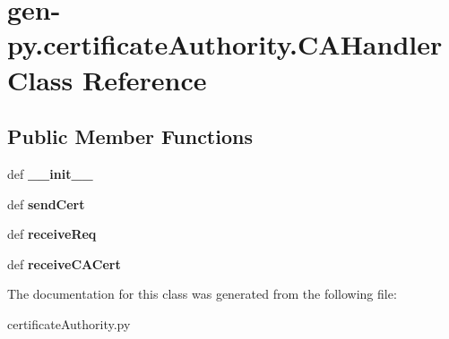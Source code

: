 \hypertarget{classgen-py_1_1certificateAuthority_1_1CAHandler}{\section{gen-\/py.certificate\-Authority.\-C\-A\-Handler \-Class \-Reference}
\label{classgen-py_1_1certificateAuthority_1_1CAHandler}
}
\subsection*{\-Public \-Member \-Functions}
\begin{DoxyCompactItemize}
\item 
\hypertarget{classgen-py_1_1certificateAuthority_1_1CAHandler_a91fcccb6c34616eb8900002cf67f912a}{def {\bfseries \-\_\-\-\_\-init\-\_\-\-\_\-}}\label{classgen-py_1_1certificateAuthority_1_1CAHandler_a91fcccb6c34616eb8900002cf67f912a}

\item 
\hypertarget{classgen-py_1_1certificateAuthority_1_1CAHandler_a341da9e7b5067c80dd3310ed977937e4}{def {\bfseries send\-Cert}}\label{classgen-py_1_1certificateAuthority_1_1CAHandler_a341da9e7b5067c80dd3310ed977937e4}

\item 
\hypertarget{classgen-py_1_1certificateAuthority_1_1CAHandler_affe56111b2d63f22d149ecbda83c7e79}{def {\bfseries receive\-Req}}\label{classgen-py_1_1certificateAuthority_1_1CAHandler_affe56111b2d63f22d149ecbda83c7e79}

\item 
\hypertarget{classgen-py_1_1certificateAuthority_1_1CAHandler_a12107978be22a9989e4ec54cf94e2197}{def {\bfseries receive\-C\-A\-Cert}}\label{classgen-py_1_1certificateAuthority_1_1CAHandler_a12107978be22a9989e4ec54cf94e2197}

\end{DoxyCompactItemize}


\-The documentation for this class was generated from the following file\-:\begin{DoxyCompactItemize}
\item 
certificate\-Authority.\-py\end{DoxyCompactItemize}

